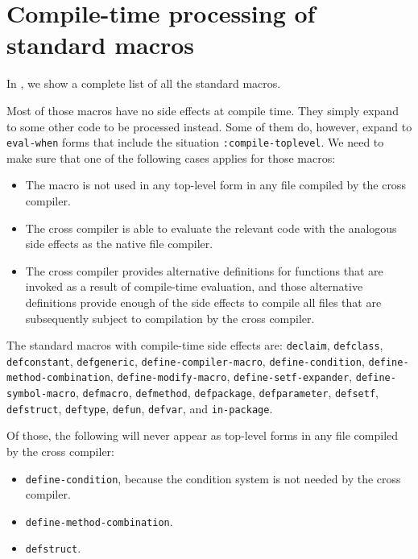 \section{Compile-time processing of standard macros}

In , we show a complete list of all
the standard \commonlisp{} macros. 

Most of those macros have no side effects at compile time.  They
simply expand to some other code to be processed instead.  Some of
them do, however, expand to \texttt{eval-when} forms that include the
situation \texttt{:compile-toplevel}.  We need to make sure that one
of the following cases applies for those macros:

\begin{itemize}
\item The macro is not used in any top-level form in any file compiled
  by the cross compiler.
\item The cross compiler is able to evaluate the relevant code with
  the analogous side effects as the native file compiler.
\item The cross compiler provides alternative definitions for
  functions that are invoked as a result of compile-time evaluation,
  and those alternative definitions provide enough of the side effects
  to compile all files that are subsequently subject to compilation by
  the cross compiler.
\end{itemize}

The standard \commonlisp{} macros with compile-time side effects are:
\texttt{declaim}, \texttt{defclass}, \texttt{defconstant},
\texttt{defgeneric}, \texttt{define-compiler-macro},
\texttt{define-condition}, \texttt{define-method-combination},
\texttt{define-modify-macro}, \texttt{define-setf-expander},
\texttt{define-symbol-macro}, \texttt{defmacro}, \texttt{defmethod},
\texttt{defpackage}, \texttt{defparameter}, \texttt{defsetf},
\texttt{defstruct}, \texttt{deftype}, \texttt{defun}, \texttt{defvar},
and \texttt{in-package}.

Of those, the following will never appear as top-level forms in any
file compiled by the cross compiler: 

\begin{itemize}
\item \texttt{define-condition}, because the condition system is not
  needed by the cross compiler.
\item \texttt{define-method-combination}.
\item \texttt{defstruct}.
\end{itemize}

